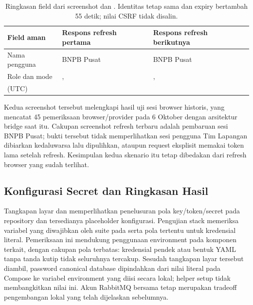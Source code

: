 \begin{table}[H]\small
\begin{tabularx}{\textwidth}{@{}P{3.0cm}YY@{}}
\toprule \textbf{Field aman} & \textbf{Respons refresh pertama} & \textbf{Respons refresh berikutnya}\\\midrule
Nama pengguna & BNPB Pusat & BNPB Pusat\\
Role dan mode & ,  & , \\
 (UTC) &  & \\\bottomrule
\end{tabularx}
\caption{Ringkasan field dari screenshot  dan . Identitas tetap sama dan expiry bertambah 55 detik; nilai CSRF tidak disalin.}
\end{table}


Kedua screenshot tersebut melengkapi hasil uji sesi browser historis, yang mencatat 45 pemeriksaan browser/provider pada 6 Oktober dengan arsitektur bridge saat itu. Cakupan screenshot refresh terbaru adalah pembaruan sesi BNPB Pusat; bukti tersebut tidak memperlihatkan sesi pengguna Tim Lapangan dibiarkan kedaluwarsa lalu dipulihkan, ataupun request eksplisit memakai token lama setelah refresh. Kesimpulan kedua skenario itu tetap dibedakan dari refresh browser yang sudah terlihat.

\subsection{Konfigurasi Secret dan Ringkasan Hasil}
Tangkapan layar  dan  memperlihatkan penelusuran pola key/token/secret pada repository dan tersedianya placeholder konfigurasi. Pengujian stack memeriksa variabel yang diwajibkan oleh suite pada  serta pola tertentu untuk kredensial literal. Pemeriksaan ini mendukung penggunaan environment pada komponen terkait, dengan cakupan pola terbatas: kredensial pendek atau bentuk YAML tanpa tanda kutip tidak seluruhnya tercakup. Sesudah tangkapan layar tersebut diambil, password canonical database dipindahkan dari nilai literal pada Compose ke variabel environment  yang diisi secara lokal; helper setup tidak membangkitkan nilai ini. Akun RabbitMQ bersama tetap merupakan tradeoff pengembangan lokal yang telah dijelaskan sebelumnya.

